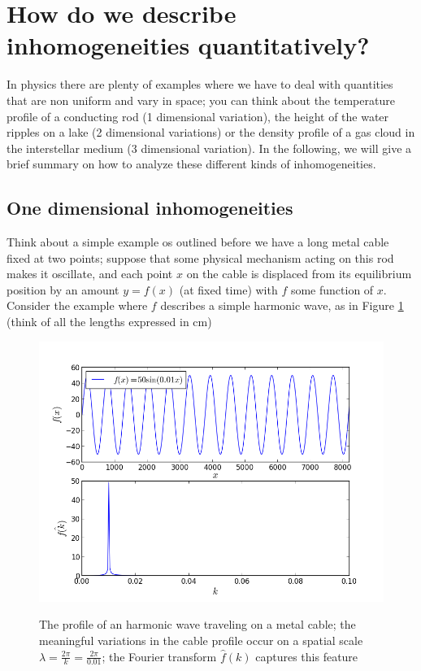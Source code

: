 \section{How do we describe inhomogeneities quantitatively?}
\label{fouriersection}
In physics there are plenty of examples where we have to deal with quantities that are non uniform and vary in space; you can think about the temperature profile of a conducting rod (1 dimensional variation), the height of the water ripples on a lake (2 dimensional variations) or the density profile of a gas cloud in the interstellar medium (3 dimensional variation). In the following, we will give a brief summary on how to analyze these different kinds of inhomogeneities. 
\subsection{One dimensional inhomogeneities}
Think about a simple example os outlined before we have a long metal cable fixed at two points; suppose that some physical mechanism acting on this rod makes it oscillate, and each point $x$ on the cable is displaced from its equilibrium position by an amount $y=f(x)$ (at fixed time) with $f$ some function of $x$. Consider the example where $f$ describes a simple harmonic wave, as in Figure \ref{fourier1d} (think of all the lengths expressed in cm)
\begin{figure}
\begin{center}
\includegraphics[scale=0.7]{Fourier/1component.png}
\label{}
\end{center}
\caption{The profile of an harmonic wave traveling on a metal cable; the meaningful variations in the cable profile occur on a spatial scale $\lambda=\frac{2\pi}{k}=\frac{2\pi}{0.01}$; the Fourier transform $\hat{f}(k)$ captures this feature}
\label{fourier1d}
\end{figure}
